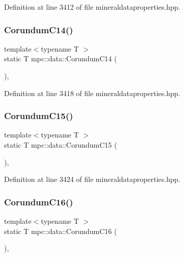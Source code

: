 Definition at line 3412 of file mineraldataproperties.\+hpp.

\mbox{\label{namespacempc_1_1data_ab7503a08bbb5f63448df10b9ff67a130}} 
\subsubsection{\texorpdfstring{Corundum\+C14()}{CorundumC14()}}
{\footnotesize\ttfamily template$<$typename T $>$ \\
static T mpc\+::data\+::\+Corundum\+C14 (\begin{DoxyParamCaption}{ }\end{DoxyParamCaption})\hspace{0.3cm}{\ttfamily [inline]}, {\ttfamily [static]}}



Definition at line 3418 of file mineraldataproperties.\+hpp.

\mbox{\label{namespacempc_1_1data_abf2d104318b0dc68e995c4494d4d2c7f}} 
\subsubsection{\texorpdfstring{Corundum\+C15()}{CorundumC15()}}
{\footnotesize\ttfamily template$<$typename T $>$ \\
static T mpc\+::data\+::\+Corundum\+C15 (\begin{DoxyParamCaption}{ }\end{DoxyParamCaption})\hspace{0.3cm}{\ttfamily [inline]}, {\ttfamily [static]}}



Definition at line 3424 of file mineraldataproperties.\+hpp.

\mbox{\label{namespacempc_1_1data_afa0eac7a5f7d01a52a7a686ca1ac59a2}} 
\subsubsection{\texorpdfstring{Corundum\+C16()}{CorundumC16()}}
{\footnotesize\ttfamily template$<$typename T $>$ \\
static T mpc\+::data\+::\+Corundum\+C16 (\begin{DoxyParamCaption}{ }\end{DoxyParamCaption})\hspace{0.3cm}{\ttfamily [inline]}, {\ttfamily [static]}}



